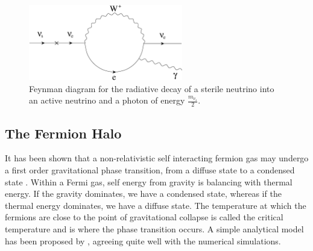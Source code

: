 \begin{figure}[pb]
	\begin{center}
	\includegraphics[angle=0,width=0.6\textwidth]{eps/fermiondecay.eps}
	\caption{Feynman diagram for the radiative decay of a sterile neutrino into an active neutrino
	and a photon of energy $\frac{m_{\nu_s}}{2}$.}
	\label{fig_feynmandiag}
	\end{center}
\end{figure}

\subsection{The Fermion Halo}
It has been shown that a non-relativistic self interacting fermion gas may undergo a first order gravitational
phase transition, from a diffuse state to a condensed state \cite{ref_halo2,ref_halo3,ref_halo4}.
Within a Fermi gas, self energy from gravity is balancing with thermal energy. If the gravity dominates, we have a condensed state,
whereas if the thermal energy dominates, we have a diffuse state. The temperature at which the fermions are close to the point of
gravitational collapse is called the critical temperature and is where the phase transition occurs. A simple analytical model has been
proposed by \cite{ref_chavanis}, agreeing quite well with the numerical simulations.

